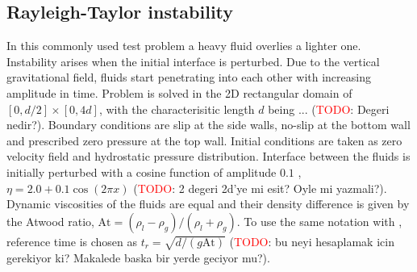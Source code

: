 \documentclass[11pt,a4paper,twoside]{article}
\begin{document}
	
	\subsection{Rayleigh-Taylor instability}
	In this commonly used test problem a heavy fluid overlies a lighter one. Instability arises when the initial interface is perturbed. Due to the vertical gravitational field, fluids start penetrating into each other with increasing amplitude in time. Problem is solved in the 2D rectangular domain of $ [0,d/2]\times [0,4d] $, with the characterisitic length $d$ being $...$ (\textcolor{red}{TODO}: Degeri nedir?). Boundary conditions are slip at the side walls, no-slip at the bottom wall and prescribed zero pressure at the top wall. Initial conditions are taken as zero velocity field and hydrostatic pressure distribution. Interface between the fluids is initially perturbed with a cosine function of amplitude $ 0.1 $ , $ \eta = 2.0 + 0.1\cos(2\pi x) $ (\textcolor{red}{TODO}: 2 degeri 2d'ye mi esit? Oyle mi yazmali?). Dynamic viscosities of the fluids are equal and their density difference is given by the Atwood ratio, $ \text{At} = (\rho_l - \rho_g)/ ( \rho_l + \rho_g)$. To use the same notation with \cite{tryggvason_numerical_1988}, reference time is chosen as $ t_r = \sqrt{d/(g\text{At})} $ (\textcolor{red}{TODO}: bu neyi hesaplamak icin gerekiyor ki? Makalede baska bir yerde geciyor mu?).
	
\end{document}
